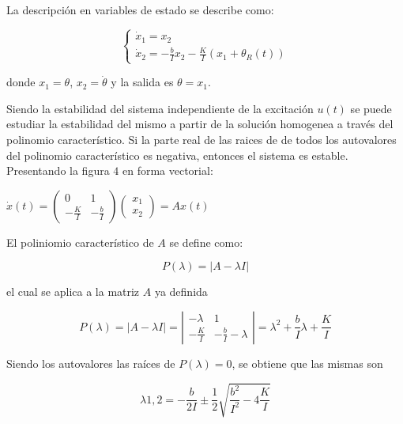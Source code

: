 \documentclass{sig-alternate}
\begin{document}
La descripci\'on en variables de estado se describe como:

\begin{equation}
\label{var_estados_model1}
\begin{cases} 
    \dot x_1 = x_2 \\
    \dot x_2 = -\frac{b}{I} x_2 - \frac{K}{I} ( x_1 + \theta_R(t))
\end{cases}
\end{equation}

donde $x_1 = \theta$, $x_2 = \dot \theta$ y la salida es $\theta=x_1$.

Siendo la estabilidad del sistema independiente de la excitaci\'{o}n $u(t)$ se puede estudiar la estabilidad del mismo
a partir de la soluci\'{o}n homogenea a trav\'{e}s del polinomio caracter\'istico. Si la parte real de las raices de
de todos los autovalores del polinomio caracter\'istico es negativa, entonces el sistema es estable.\\
Presentando la figura $4$ en forma vectorial:
\begin{center}
$
\dot x(t) = 
\left( \begin{array}{cc}
0 & 1 \\
-\frac{K}{I} & -\frac{b}{I}
\end{array} \right)
\left( \begin{array}{c}
x_1 \\
x_2
\end{array} \right)
= Ax(t)
$
\end{center}
El poliniomio caracter\'istico de $A$ se define como:

\begin{equation}
 P( \lambda ) = |A - \lambda I|
\end{equation}

el cual se aplica a la matriz $A$ ya definida

\begin{equation}
 P( \lambda ) = |A - \lambda I| = 
\left| \begin{array}{cc}
-\lambda & 1 \\
-\frac{K}{I} & -\frac{b}{I}-\lambda
\end{array} \right| 
=
\lambda^2 + \frac{b}{I} \lambda + \frac{K}{I}
\end{equation}

Siendo los autovalores las ra\'ices de $P(\lambda) = 0$, se obtiene que las mismas son

\begin{equation}
 \lambda{1,2} = - \frac{b}{2I} \pm \frac{1}{2} \sqrt{\frac{b^2}{I^2}-4\frac{K}{I}}
\end{equation}
\end{document}
